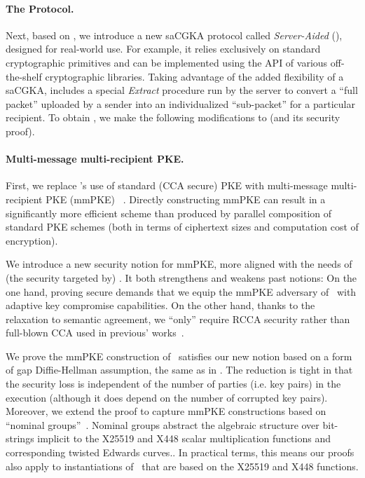 \paragraph{The \saik Protocol.}
Next, based on \protITK, we introduce a new saCGKA protocol called
\emph{Server-Aided \protITK} (\saik), designed for real-world use.
For example, it relies exclusively on standard cryptographic primitives and
can be implemented using the API of various off-the-shelf cryptographic
libraries. Taking advantage of the added flexibility of a saCGKA, \saik
includes a special \emph{Extract} procedure run by the server to convert a
``full packet'' uploaded by a sender into an individualized ``sub-packet'' for a particular recipient. To obtain \saik, we make the following
modifications to \protITK (and its security proof).

\paragraph{Multi-message multi-recipient PKE.} First, we
replace \protITK's use of standard (CCA secure) PKE with multi-message
multi-recipient PKE (mmPKE) ~\cite{ASIACCS:PinPoeSch14}.
Directly constructing mmPKE can result in a significantly more efficient
scheme than produced by parallel composition of standard PKE schemes (both in
terms of ciphertext sizes and computation cost of encryption).

We introduce a new security notion for mmPKE, more aligned with the needs of
(the security targeted by) \saik. It both strengthens and weakens past
notions: On the one hand, proving \saik secure demands that we equip the
mmPKE adversary of~\cite{ASIACCS:PinPoeSch14} with adaptive key compromise
capabilities. On the other hand, thanks to the relaxation to semantic
agreement, we ``only'' require RCCA
security rather than full-blown CCA used in previous'
works~\cite{TCC:ACJM20,EPRINT:AlwJosMul20}.

We prove the mmPKE construction of~\cite{ASIACCS:PinPoeSch14} satisfies our
new notion based on a form of gap Diffie-Hellman assumption, the same as in
\cite{ASIACCS:PinPoeSch14}. The reduction is tight in that the security loss
is independent of the number of parties (i.e. key pairs) in the execution
(although it does depend on the number of corrupted key pairs). Moreover, we
extend the proof to capture mmPKE constructions based on ``nominal
groups''~\cite{EC:ABHKLR21_2}. Nominal groups abstract the algebraic
structure over bit-strings implicit to the X25519 and X448 scalar
multiplication functions and corresponding twisted Edwards
curves.\cite{rfc7748}. In practical terms, this means our proofs also apply
to instantiations of~\cite{ASIACCS:PinPoeSch14} that are based on the X25519
and X448 functions.

